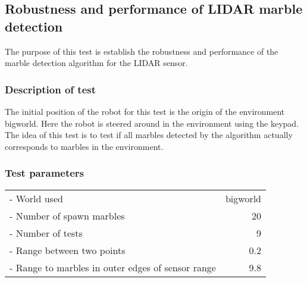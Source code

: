 \documentclass[../Head/Main.tex]{subfiles}
\begin{document}
\subsection{Robustness and performance of LIDAR marble detection}
\label{test:MarbleDetection}

The purpose of this test is establish the robustness and performance of the marble detection algorithm for the LIDAR sensor.

\subsubsection*{Description of test}
The initial position of the robot for this test is the origin of the environment bigworld. Here the robot is steered around in the environment using the keypad. The idea of this test is to test if all marbles detected by the algorithm actually corresponds to marbles in the environment.     

\subsubsection*{Test parameters}
\begin{tabular}{l r}
	- World used                & bigworld\\	
	- Number of spawn marbles   & 20\\
	- Number of tests           & 9\\
	- Range between two points  & 0.2\\
	- Range to marbles in outer edges of sensor range & 9.8
\end{tabular}
\end{document}
